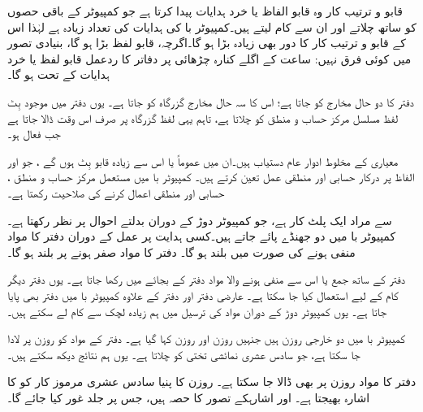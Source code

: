 قابو و ترتیب کار وہ قابو الفاظ یا خرد ہدایات پیدا کرتا ہے جو    کمپیوٹر  کے باقی حصوں کو  ساتھ چلاتے اور ان سے کام   لیتے ہیں۔کمپیوٹر با کی ہدایات کی تعداد زیادہ ہے لہٰذا  اس کے قابو و ترتیب کار  کا دور بھی زیادہ بڑا ہو گا۔اگرچہ، قابو لفظ بڑا ہو گا، بنیادی تصور میں کوئی فرق نہیں: ساعت کے اگلے کنارہ چڑھائی پر دفاتر کا ردعمل   قابو لفظ یا خرد ہدایات کے تحت ہو گا۔

دفتر  کا دو حال مخارج  کو جاتا ہے؛ اس کا سہ حال مخارج  گزرگاہ کو جاتا ہے۔ یوں دفتر  میں موجود  بِٹ لفظ مسلسل مرکز حساب و منطق کو چلاتا ہے، تاہم  یہی لفظ گزرگاہ پر صرف اس وقت  ڈالا جاتا ہے  جب  فعال ہو۔

معیاری      کے مخلوط ادوار عام دستیاب ہیں۔ان    میں عموماً  یا اس سے زیادہ  قابو بِٹ  ہوں گے ، جو   اور  الفاظ پر درکار حسابی اور منطقی عمل  تعین کرتے ہیں۔  کمپیوٹر با  میں مستعمل  مرکز حساب و منطق ، حسابی  اور منطقی اعمال کرنے کی صلاحیت رکھتا  ہے۔

 سے مراد    ایک   پلٹ کار  ہے، جو  کمپیوٹر دوڑ کے دوران بدلتے احوال   پر نظر رکھتا ہے۔ کمپیوٹر با میں دو جھنڈے پائے جاتے ہیں۔کسی ہدایت پر عمل کے دوران دفتر  کا مواد منفی ہونے  کی صورت میں   بلند ہو گا۔ دفتر  کا مواد صفر ہونے پر  بلند ہو گا۔

دفتر  کے ساتھ جمع  یا اس سے منفی ہونے والا مواد دفتر  کے بجائے میں رکھا جاتا ہے۔ یوں دفتر  دیگر کام کے لیے استعمال کیا جا سکتا ہے۔ عارضی دفتر اور دفتر  کے علاوہ کمپیوٹر با میں دفتر  بھی پایا جاتا ہے۔ یوں کمپیوٹر دوڑ کے دوران  مواد کی ترسیل میں ہم زیادہ لچک سے کام لے سکتے ہیں۔

کمپیوٹر  با میں دو خارجی روزن ہیں جنہیں روزن  اور روزن  کہا گیا ہے۔ دفتر  کے مواد کو روزن  پر لادا جا سکتا ہے،  جو سادس عشری نمائشی تختی کو چلاتا ہے۔ یوں ہم نتائج دیکھ سکتے ہیں۔

دفتر  کا مواد  روزن  پر بھی ڈالا جا سکتا ہے۔ روزن  کا پنیا  سادس عشری  مرموز کار کو  کا اشارہ  بھیجتا  ہے۔ اور   اشارہکے تصور کا حصہ ہیں، جس پر جلد غور کیا جائے گا۔


